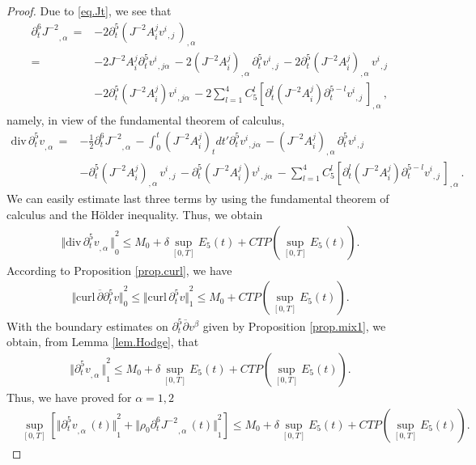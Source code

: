 \documentclass[12pt,twoside,reqno]{amsart}
\numberwithin{equation}{section}
\theoremstyle{definition}
\theoremstyle{remark}
\begin{document}
\begin{proof}
Due to \eqref{eq.Jt}, we see that
\begin{align*}
  {{{{\partial}_t^6 J^{-2}}}_{,{\alpha}}\,}=&-2 {{{{\partial}_t^5(J^{-2}A_i^j{{{v^i}}_{,{j}}\,})}}_{,{\alpha}}\,}\\
  =&-2 J^{-2}A_i^j{\partial}_t^5{{{v^i}}_{,{j\alpha}}\,}-2 {{{(J^{-2}A_i^j)}}_{,{\alpha}}\,}{\partial}_t^5{{{v^i}}_{,{j}}\,}-2 {{{{\partial}_t^5 (J^{-2}A_i^j)}}_{,{\alpha}}\,}{{{v^i}}_{,{j}}\,}\\
  &-2 {\partial}_t^5 (J^{-2}A_i^j){{{v^i}}_{,{j\alpha}}\,}-2 \sum_{l=1}^4 C_5^l {{{[{\partial}_t^l( J^{-2}A_i^j){\partial}_t^{5-l}{{{v^i}}_{,{j}}\,}]}}_{,{\alpha}}\,},
\end{align*}
namely, in view of the fundamental theorem of calculus,
\begin{align*}
  {\mathrm{div}\,}{{{{\partial}_t^5v}}_{,{\alpha}}\,}=&-\frac{1}{2}{{{{\partial}_t^6 J^{-2}}}_{,{\alpha}}\,}-\int_0^t(J^{-2}A_i^j)_tdt'{\partial}_t^5{{{v^i}}_{,{j\alpha}}\,}- {{{(J^{-2}A_i^j)}}_{,{\alpha}}\,}{\partial}_t^5{{{v^i}}_{,{j}}\,}\\
  &- {{{{\partial}_t^5 (J^{-2}A_i^j)}}_{,{\alpha}}\,}{{{v^i}}_{,{j}}\,}- {\partial}_t^5 (J^{-2}A_i^j){{{v^i}}_{,{j\alpha}}\,}- \sum_{l=1}^4 C_5^l {{{[{\partial}_t^l( J^{-2}A_i^j){\partial}_t^{5-l}{{{v^i}}_{,{j}}\,}]}}_{,{\alpha}}\,}.
\end{align*}
We can easily estimate last three terms by using the fundamental theorem of calculus and the H\"older inequality. Thus, we obtain
\begin{align*}
  {\Vert{{\mathrm{div}\,}{{{ {\partial}_t^5v}}_{,{\alpha}}\,}}\Vert}_0^2{\leqslant} M_0+\delta \sup_{[0,T]} E_5(t)+CTP(\sup_{[0,T]}E_5(t)).
\end{align*}
According to Proposition \ref{prop.curl}, we have
\begin{align*}
  {\Vert{{\mathrm{curl}\,}{\overline{\partial}} {\partial}_t^5v}\Vert}_0^2{\leqslant}{\Vert{{\mathrm{curl}\,}{\partial}_t^5 v}\Vert}_1^2{\leqslant} M_0+CTP(\sup_{[0,T]}E_5(t)).
\end{align*}
With the boundary estimates on ${\partial}_t^5 {\overline{\partial}} v^\beta$  given by Proposition \ref{prop.mix1}, we obtain, from Lemma \ref{lem.Hodge}, that
\begin{align*}
  {\Vert{{{{{\partial}_t^5 v}}_{,{\alpha}}\,}}\Vert}_1^2{\leqslant} M_0+\delta \sup_{[0,T]} E_5(t)+CTP(\sup_{[0,T]}E_5(t)).
\end{align*}
Thus, we have proved for $\alpha=1,2$
\begin{align}\label{eq.v3.3}
  &\sup_{[0,T]}\left[{\Vert{{{{{\partial}_t^5 v}}_{,{\alpha}}\,}(t)}\Vert}_1^2+{\Vert{{\rho_0} {{{{\partial}_t^6 J^{-2}}}_{,{\alpha}}\,}(t)}\Vert}_1^2\right]
  {\leqslant} M_0+\delta \sup_{[0,T]} E_5(t)+CTP(\sup_{[0,T]}E_5(t)).
\end{align}


\end{proof}
\end{document}
